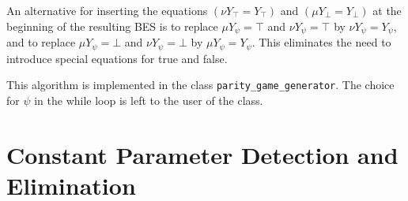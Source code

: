 \documentclass{article}
\begin{document}
An alternative for inserting the equations $(\nu Y_{\top }=Y_{\top })$ and $%
(\mu Y_{\bot }=Y_{\bot })$ at the beginning of the resulting BES is to
replace $\mu Y_{\psi }=\top $ and $\nu Y_{\psi }=\top $ by $\nu Y_{\psi
}=Y_{\psi }$, and to replace $\mu Y_{\psi }=\bot $ and $\nu Y_{\psi }=\bot $
by $\mu Y_{\psi }=Y_{\psi }$. This eliminates the need to introduce special
equations for true and false.

This algorithm is implemented in the class \texttt{parity\_game\_generator}.
The choice for $\psi$ in the while loop is left to the user of the class.

\pagebreak

\section{Constant Parameter Detection and Elimination}
\end{document}
